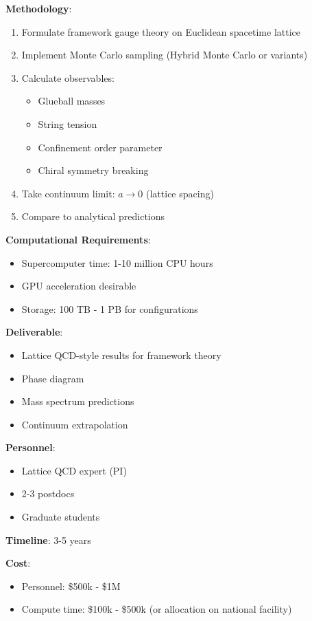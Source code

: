 \textbf{Methodology}:
\begin{enumerate}
    \item Formulate framework gauge theory on Euclidean spacetime lattice
    \item Implement Monte Carlo sampling (Hybrid Monte Carlo or variants)
    \item Calculate observables:
    \begin{itemize}
        \item Glueball masses
        \item String tension
        \item Confinement order parameter
        \item Chiral symmetry breaking
    \end{itemize}
    \item Take continuum limit: $a \to 0$ (lattice spacing)
    \item Compare to analytical predictions
\end{enumerate}

\textbf{Computational Requirements}:
\begin{itemize}
    \item Supercomputer time: 1-10 million CPU hours
    \item GPU acceleration desirable
    \item Storage: 100 TB - 1 PB for configurations
\end{itemize}

\textbf{Deliverable}:
\begin{itemize}
    \item Lattice QCD-style results for framework theory
    \item Phase diagram
    \item Mass spectrum predictions
    \item Continuum extrapolation
\end{itemize}

\textbf{Personnel}:
\begin{itemize}
    \item Lattice QCD expert (PI)
    \item 2-3 postdocs
    \item Graduate students
\end{itemize}

\textbf{Timeline}: 3-5 years

\textbf{Cost}:
\begin{itemize}
    \item Personnel: \$500k - \$1M
    \item Compute time: \$100k - \$500k (or allocation on national facility)
\end{itemize}


